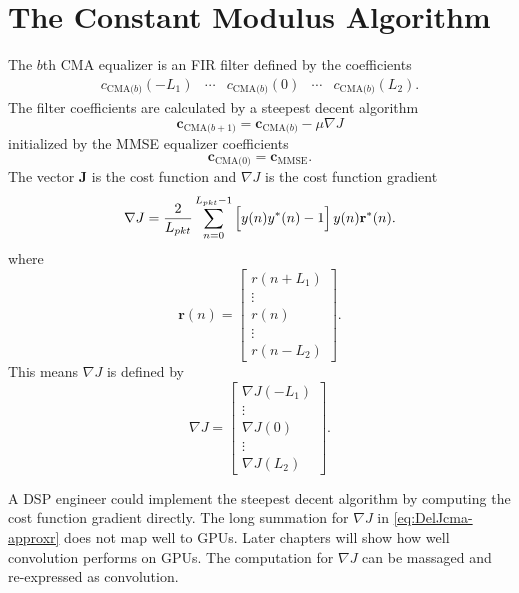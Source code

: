 \section{The Constant Modulus Algorithm}
\label{sec:CMA}
The $b$th CMA equalizer is an FIR filter defined by the coefficients
\begin{equation}
\begin{matrix}
c_\text{CMA($b$)}(-L_1) & \cdots & c_\text{CMA($b$)}(0) & \cdots & c_\text{CMA($b$)}(L_2).
\end{matrix}
\end{equation}
The filter coefficients are calculated by a steepest decent algorithm 
\begin{equation}
\mathbf{c}_\text{CMA($b+1$)} = \mathbf{c}_\text{CMA($b$)}-\mu \nabla J
\label{eq:steepest}
\end{equation}
initialized by the MMSE equalizer coefficients
\begin{equation}
\mathbf{c}_\text{CMA($0$)} = \mathbf{c}_\text{MMSE}.
\end{equation}
The vector $\mathbf{J}$ is the cost function and $\nabla J$ is the cost function gradient \cite[eq. (352)]{PAQ-phase1}
\begin{equation}
	\nabla J = \frac{2}{L_{pkt}} \sum_{n=0}^{L_{pkt}-1}
	\left[ \vphantom{\displaystyle\sum}  y(n) y^\ast(n) - 1 \right]
	y(n)  \mathbf{r}^\ast(n).
\label{eq:DelJcma-approxr}
\end{equation}
where
\begin{equation}
\mathbf{r}(n) = \begin{bmatrix} r(n+L_1) \\ \vdots \\ r(n) \\ \vdots \\ r(n-L_2) \end{bmatrix}.
\end{equation}
This means $\nabla J$ is defined by
\begin{equation}
\nabla J = \begin{bmatrix} \nabla J(-L_1) \\ \vdots \\ \nabla J(0) \\ \vdots \\ \nabla J(L_2) \end{bmatrix}.
\end{equation}

A DSP engineer could implement the steepest decent algorithm by computing the cost function gradient directly.
The long summation for $\nabla J$ in \eqref{eq:DelJcma-approxr} does not map well to GPUs.
Later chapters will show how well convolution performs on GPUs.
The computation for $\nabla J$ can be massaged and re-expressed as convolution.


